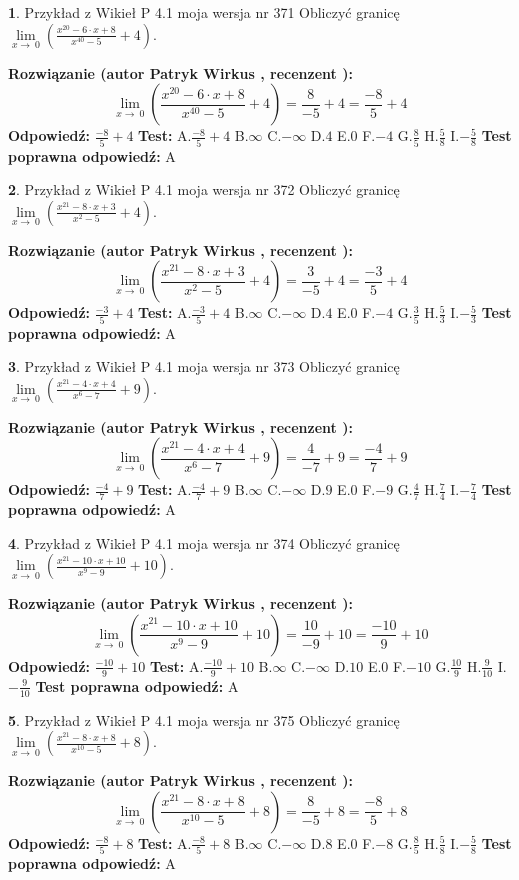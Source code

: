\documentclass[12pt, a4paper]{article}
\theoremstyle{definition} %
\newtheorem{zad}{}
\newcommand{\zadStart}[1]{\begin{zad}#1\newline}
\newcommand{\zadStop}{\end{zad}}
\newcommand{\rozwStart}[2]{\noindent \textbf{Rozwiązanie (autor #1 , recenzent #2): }\newline}
\newcommand{\rozwStop}{\newline}
\newcommand{\odpStart}{\noindent \textbf{Odpowiedź:}\newline}
\newcommand{\odpStop}{\newline}
\newcommand{\testStart}{\noindent \textbf{Test:}\newline}
\newcommand{\testStop}{\newline}
\newcommand{\kluczStart}{\noindent \textbf{Test poprawna odpowiedź:}\newline}
\newcommand{\kluczStop}{\newline}
\begin{document}
\zadStart{Przykład z Wikieł P 4.1 moja wersja nr 371}
Obliczyć granicę $\lim\limits_{x\to\ 0}(\frac{x^{20}-6 \cdot x +8}{x^{40}-5}+4)$.
\zadStop
\rozwStart{Patryk Wirkus}{}
$$\lim\limits_{x\to\ 0}(\frac{x^{20}-6 \cdot x +8}{x^{40}-5}+4)=\frac{8}{-5}+4=\frac{-8}{5}+4$$
\rozwStop
\odpStart
$\frac{-8}{5}+4$
\odpStop
\testStart
A.$\frac{-8}{5}+4$
B.$\infty$
C.$-\infty$
D.$4$
E.$0$
F.$-4$
G.$\frac{8}{5}$
H.$\frac{5}{8}$
I.$-\frac{5}{8}$
\testStop
\kluczStart
A
\kluczStop



\zadStart{Przykład z Wikieł P 4.1 moja wersja nr 372}
Obliczyć granicę $\lim\limits_{x\to\ 0}(\frac{x^{21}-8 \cdot x +3}{x^{2}-5}+4)$.
\zadStop
\rozwStart{Patryk Wirkus}{}
$$\lim\limits_{x\to\ 0}(\frac{x^{21}-8 \cdot x +3}{x^{2}-5}+4)=\frac{3}{-5}+4=\frac{-3}{5}+4$$
\rozwStop
\odpStart
$\frac{-3}{5}+4$
\odpStop
\testStart
A.$\frac{-3}{5}+4$
B.$\infty$
C.$-\infty$
D.$4$
E.$0$
F.$-4$
G.$\frac{3}{5}$
H.$\frac{5}{3}$
I.$-\frac{5}{3}$
\testStop
\kluczStart
A
\kluczStop



\zadStart{Przykład z Wikieł P 4.1 moja wersja nr 373}
Obliczyć granicę $\lim\limits_{x\to\ 0}(\frac{x^{21}-4 \cdot x +4}{x^{6}-7}+9)$.
\zadStop
\rozwStart{Patryk Wirkus}{}
$$\lim\limits_{x\to\ 0}(\frac{x^{21}-4 \cdot x +4}{x^{6}-7}+9)=\frac{4}{-7}+9=\frac{-4}{7}+9$$
\rozwStop
\odpStart
$\frac{-4}{7}+9$
\odpStop
\testStart
A.$\frac{-4}{7}+9$
B.$\infty$
C.$-\infty$
D.$9$
E.$0$
F.$-9$
G.$\frac{4}{7}$
H.$\frac{7}{4}$
I.$-\frac{7}{4}$
\testStop
\kluczStart
A
\kluczStop



\zadStart{Przykład z Wikieł P 4.1 moja wersja nr 374}
Obliczyć granicę $\lim\limits_{x\to\ 0}(\frac{x^{21}-10 \cdot x +10}{x^{9}-9}+10)$.
\zadStop
\rozwStart{Patryk Wirkus}{}
$$\lim\limits_{x\to\ 0}(\frac{x^{21}-10 \cdot x +10}{x^{9}-9}+10)=\frac{10}{-9}+10=\frac{-10}{9}+10$$
\rozwStop
\odpStart
$\frac{-10}{9}+10$
\odpStop
\testStart
A.$\frac{-10}{9}+10$
B.$\infty$
C.$-\infty$
D.$10$
E.$0$
F.$-10$
G.$\frac{10}{9}$
H.$\frac{9}{10}$
I.$-\frac{9}{10}$
\testStop
\kluczStart
A
\kluczStop



\zadStart{Przykład z Wikieł P 4.1 moja wersja nr 375}
Obliczyć granicę $\lim\limits_{x\to\ 0}(\frac{x^{21}-8 \cdot x +8}{x^{10}-5}+8)$.
\zadStop
\rozwStart{Patryk Wirkus}{}
$$\lim\limits_{x\to\ 0}(\frac{x^{21}-8 \cdot x +8}{x^{10}-5}+8)=\frac{8}{-5}+8=\frac{-8}{5}+8$$
\rozwStop
\odpStart
$\frac{-8}{5}+8$
\odpStop
\testStart
A.$\frac{-8}{5}+8$
B.$\infty$
C.$-\infty$
D.$8$
E.$0$
F.$-8$
G.$\frac{8}{5}$
H.$\frac{5}{8}$
I.$-\frac{5}{8}$
\testStop
\kluczStart
A
\kluczStop
\end{document}
